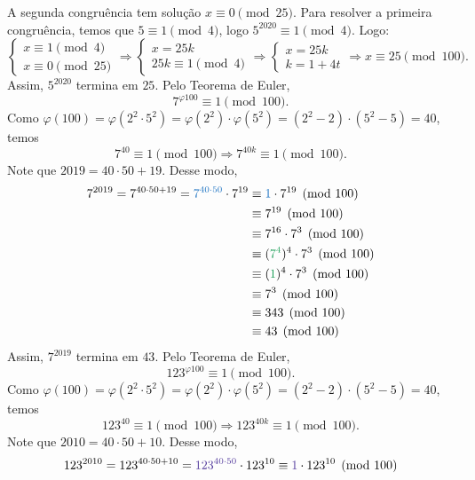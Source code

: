 \documentclass[12pt, a4paper]{article}
\newcommand{\negrito}[1]{\mbox{\boldmath{$#1$}}}
\newcommand{\alt}[1]{\textcolor{Floresta}{$\negrito{(#1)} $}}
\begin{document}
\begin{solution}
{    A segunda congruência tem solução $x\equiv 0 \pmod{25}$. Para resolver a primeira congruência, temos que $5\equiv 1 \pmod{4}$, logo $5^{2020}\equiv 1 \pmod{4}.$
    Logo:
    $$\left\{\begin{array}{l}
    x\equiv 1 \pmod 4\\
    x\equiv 0 \pmod{25}
    \end{array}\right. \Rightarrow 
    \left\{\begin{array}{l}
    x=25k\\
    25k\equiv 1 \pmod 4
    \end{array}\right. \Rightarrow 
    \left\{\begin{array}{l}
    x=25k\\
    k = 1+4t
    \end{array}\right. \Rightarrow x\equiv 25 \pmod{100}
    .$$
  Assim, $5^{2020}$ termina em $25$.
  \task[\alt{d}] Pelo Teorema de Euler,
  \[
  7^{\varphi{100}} \equiv 1 \pmod{100}.
  \]
  Como $\varphi(100)=\varphi(2^2\cdot5^2)=\varphi(2^2)\cdot\varphi(5^2)=(2^2-2)\cdot(5^2-5)=40$, temos
  \[7^{40} \equiv 1 \pmod{100} \Rightarrow 7^{40k}\equiv 1 \pmod{100}.\] 
Note que $2019=40\cdot50+19.$ Desse modo,
\begin{align*}
    7^{2019} = 7^{40 \cdot 50 + 19} = \textcolor{RoyalBlue}{7^{40 \cdot 50}} \cdot 7^{19} &\equiv \textcolor{RoyalBlue}{1} \cdot 7^{19} \pmod{100} \\
    &\equiv 7^{19} \pmod{100} \\
    &\equiv 7^{16} \cdot 7^3 \pmod{100} \\
    &\equiv (\textcolor{ForestGreen}{7^4})^4 \cdot 7^3 \pmod{100} \\
   &\equiv (\textcolor{ForestGreen}{1})^4 \cdot 7^3 \pmod{100} \\
   &\equiv 7^3 \pmod{100} \\
   &\equiv 343 \pmod{100} \\
   &\equiv 43 \pmod{100}
\end{align*}
 Assim, $7^{2019}$ termina em $43$.
  \task[\alt{e}] Pelo Teorema de Euler,
  \[
  123^{\varphi{100}} \equiv 1 \pmod{100}.
  \]
  Como $\varphi(100)=\varphi(2^2\cdot5^2)=\varphi(2^2)\cdot\varphi(5^2)=(2^2-2)\cdot(5^2-5)=40$, temos
  \[123^{40} \equiv 1 \pmod{100} \Rightarrow 123^{40k}\equiv 1 \pmod{100}.\] 
Note que $2010=40\cdot50+10.$ Desse modo,
\begin{align*}
    123^{2010} = 123^{40 \cdot 50 + 10} = \textcolor{Violet}{123^{40 \cdot 50}} \cdot 123^{10} &\equiv \textcolor{Violet}{1} \cdot 123^{10} \pmod{100} \\

\end{align*}}
\end{solution}
\end{document}

